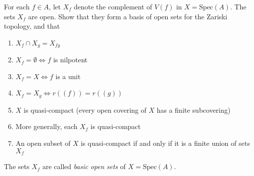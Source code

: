 \begin{ex}
	For each $f \in A$, let $X_f$ denote the complement of $V(f)$ in $X = \text{Spec}(A)$. The sets $X_f$ are open. Show that they form a basis of open sets for the Zariski topology, and that
	\begin{enumerate}[label=(\roman*)]
		\item $X_f \cap X_g = X_{fg}$
		\item $X_f = \emptyset \iff f$ is nilpotent
		\item $X_f = X \iff f$ is a unit
		\item $X_f = X_g \iff r((f)) = r((g))$
		\item $X$ is quasi-compact (every open covering of $X$ has a finite subcovering)
		\item More generally, each $X_f$ is quasi-compact
		\item An open subset of $X$ is quasi-compact if and only if it is a finite union of sets $X_f$
	\end{enumerate}
	The sets $X_f$ are called \textit{basic open sets} of $X = \text{Spec}(A)$.
\end{ex}

